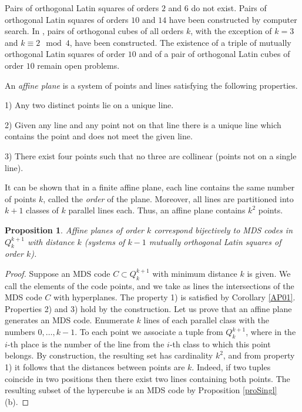\documentclass[11pt]{article}
\newtheorem{claim}{Proposition}[section]
\theoremstyle{definition}
\begin{document}
{{{Pairs of orthogonal Latin squares of orders $2$ and $6$ do not
exist. Pairs of orthogonal Latin squares of orders $10$ and
$14$ have been constructed by   computer search. In \cite{Ji}, pairs of
orthogonal cubes of all orders $k$, with the exception of $k=3$ and $k\equiv
2\mod 4$, have been constructed.
 The  existence of a triple of
mutually orthogonal Latin squares of order $10$ and of a pair of
orthogonal Latin cubes of order $10$ remain
open problems. \label{LSprob}

An {\sl affine plane} is a system of points and lines
satisfying the following properties.

1) Any two distinct points lie on a unique line.

2) Given any line and any point not on that line there is a unique line which contains the point and does not meet the given line. 

3) There exist four points such that no three are collinear (points not on a single line).

It can be shown that in a finite affine plane, each line
contains the same number of points $k$, called the {\sl order} of the
plane. Moreover, all lines are partitioned into $k+1$ classes of $k$
parallel lines each. Thus, an affine plane
contains $k^2$ points.

\begin{claim} Affine planes of order $k$ correspond bijectively
to {\rm MDS} codes in $Q^{k+1}_k$ with distance $k$
(systems of $k-1$ mutually orthogonal Latin squares
of order $k$).
\end{claim}
\begin{proof} Suppose an {\rm MDS} code $C\subset Q^{k+1}_k$ with minimum distance
$k$ is given. We call the elements of the code points, and we take as lines the
intersections of the {\rm MDS} code $C$ with hyperplanes. The 
property 1) is satisfied by Corollary \ref{AP01}. Properties 2) and 3)
hold by the construction. Let us prove that an affine plane generates an
{\rm MDS} code. Enumerate  $k$ lines of each parallel class
with the numbers $0,\dots,k-1$. To each point we associate a tuple from $Q^{k+1}_k$,
where in the $i$-th place is the number of the line from the $i$-th class to which
this point belongs. By construction, the resulting set has
cardinality $k^2$, and from property 1) it follows that the distances between
points are $k$. Indeed, if two tuples coincide in two positions then there exist two lines containing both points.  The resulting subset of the hypercube is an {\rm
MDS} code by Proposition \ref{proSingl} (b).
\end{proof}

}}}
\end{document}
